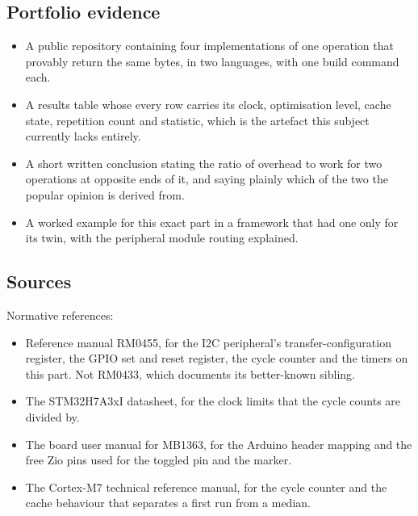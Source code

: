 \subsection*{Portfolio evidence}

\begin{itemize}
\item A public repository containing four implementations of one operation that
provably return the same bytes, in two languages, with one build command each.
\item A results table whose every row carries its clock, optimisation level,
cache state, repetition count and statistic, which is the artefact this subject
currently lacks entirely.
\item A short written conclusion stating the ratio of overhead to work for two
operations at opposite ends of it, and saying plainly which of the two the
popular opinion is derived from.
\item A worked example for this exact part in a framework that had one only for
its twin, with the peripheral module routing explained.
\end{itemize}

\subsection*{Sources}

Normative references:
\begin{itemize}
\item Reference manual RM0455, for the I2C peripheral's transfer-configuration
register, the GPIO set and reset register, the cycle counter and the timers on
this part. Not RM0433, which documents its better-known sibling.
\item The STM32H7A3xI datasheet, for the clock limits that the cycle counts are
divided by.
\item The board user manual for MB1363, for the Arduino header mapping and the
free Zio pins used for the toggled pin and the marker.
\item The Cortex-M7 technical reference manual, for the cycle counter and the
cache behaviour that separates a first run from a median.
\end{itemize}

